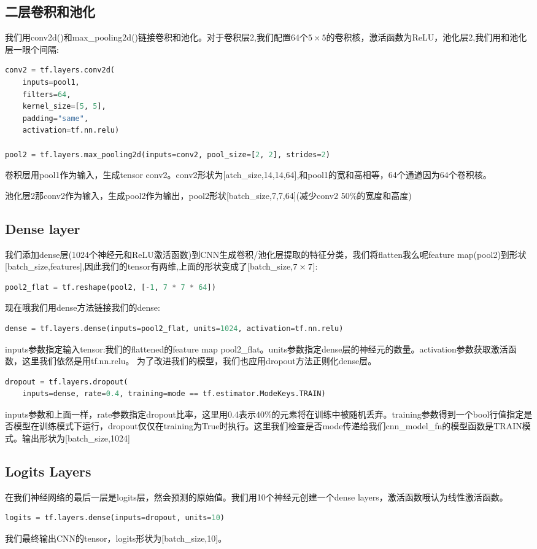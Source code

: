 \subsection{二层卷积和池化}
我们用conv2d()和max\_pooling2d()链接卷积和池化。对于卷积层2,我们配置64个$5\times5$的卷积核，激活函数为ReLU，池化层2,我们用和池化层一眼个间隔:
\begin{lstlisting}[language=Python]
conv2 = tf.layers.conv2d(
    inputs=pool1,
    filters=64,
    kernel_size=[5, 5],
    padding="same",
    activation=tf.nn.relu)

pool2 = tf.layers.max_pooling2d(inputs=conv2, pool_size=[2, 2], strides=2)
\end{lstlisting}
卷积层用pool1作为输入，生成tensor conv2。conv2形状为[atch\_size,14,14,64],和pool1的宽和高相等，64个通道因为64个卷积核。

池化层2那conv2作为输入，生成pool2作为输出，pool2形状[batch\_size,7,7,64](减少conv2 50\%的宽度和高度)
\subsection{Dense layer}
我们添加dense层(1024个神经元和ReLU激活函数)到CNN生成卷积/池化层提取的特征分类，我们将flatten我么呢feature map(pool2)到形状[batch\_size,features],因此我们的tensor有两维,上面的形状变成了[batch\_size,$7\times7\time64$]:
\begin{lstlisting}[language=Python]
pool2_flat = tf.reshape(pool2, [-1, 7 * 7 * 64])
\end{lstlisting}
现在哦我们用dense方法链接我们的dense:
\begin{lstlisting}[language=Python]
dense = tf.layers.dense(inputs=pool2_flat, units=1024, activation=tf.nn.relu)
\end{lstlisting}
inputs参数指定输入tensor:我们的flattened的feature map pool2\_flat。units参数指定dense层的神经元的数量。activation参数获取激活函数，这里我们依然是用tf.nn.relu。
为了改进我们的模型，我们也应用dropout方法正则化dense层。
\begin{lstlisting}[language=Python]
dropout = tf.layers.dropout(
    inputs=dense, rate=0.4, training=mode == tf.estimator.ModeKeys.TRAIN)
\end{lstlisting}
inputs参数和上面一样，rate参数指定dropout比率，这里用0.4表示40\%的元素将在训练中被随机丢弃。training参数得到一个bool行值指定是否模型在训练模式下运行，dropout仅仅在training为True时执行。这里我们检查是否mode传递给我们cnn\_model\_fn的模型函数是TRAIN模式。输出形状为[batch\_size,1024]
\subsection{Logits Layers}
在我们神经网络的最后一层是logits层，然会预测的原始值。我们用10个神经元创建一个dense layers，激活函数哦认为线性激活函数。
\begin{lstlisting}[language=Python]
logits = tf.layers.dense(inputs=dropout, units=10)
\end{lstlisting}
我们最终输出CNN的tensor，logits形状为[batch\_size,10]。
